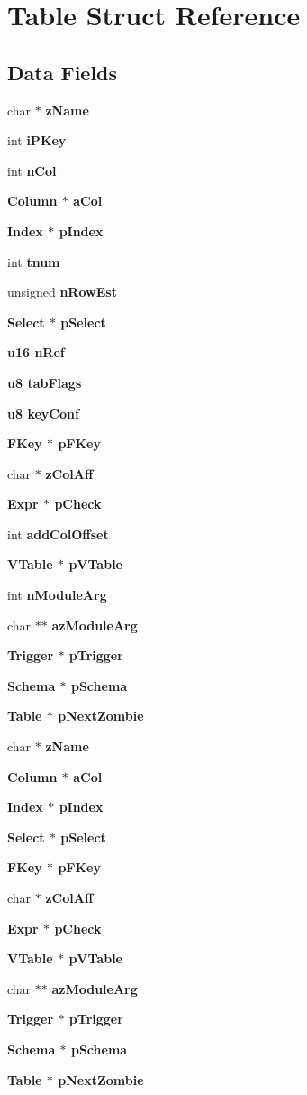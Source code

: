 \section{Table Struct Reference}
\label{structTable}
\subsection*{Data Fields}
\begin{CompactItemize}
\item 
char $\ast$ \bf{z\-Name}
\item 
int \bf{i\-PKey}
\item 
int \bf{n\-Col}
\item 
\bf{Column} $\ast$ \bf{a\-Col}
\item 
\bf{Index} $\ast$ \bf{p\-Index}
\item 
int \bf{tnum}
\item 
unsigned \bf{n\-Row\-Est}
\item 
\bf{Select} $\ast$ \bf{p\-Select}
\item 
\bf{u16} \bf{n\-Ref}
\item 
\bf{u8} \bf{tab\-Flags}
\item 
\bf{u8} \bf{key\-Conf}
\item 
\bf{FKey} $\ast$ \bf{p\-FKey}
\item 
char $\ast$ \bf{z\-Col\-Aff}
\item 
\bf{Expr} $\ast$ \bf{p\-Check}
\item 
int \bf{add\-Col\-Offset}
\item 
\bf{VTable} $\ast$ \bf{p\-VTable}
\item 
int \bf{n\-Module\-Arg}
\item 
char $\ast$$\ast$ \bf{az\-Module\-Arg}
\item 
\bf{Trigger} $\ast$ \bf{p\-Trigger}
\item 
\bf{Schema} $\ast$ \bf{p\-Schema}
\item 
\bf{Table} $\ast$ \bf{p\-Next\-Zombie}
\item 
char $\ast$ \bf{z\-Name}
\item 
\bf{Column} $\ast$ \bf{a\-Col}
\item 
\bf{Index} $\ast$ \bf{p\-Index}
\item 
\bf{Select} $\ast$ \bf{p\-Select}
\item 
\bf{FKey} $\ast$ \bf{p\-FKey}
\item 
char $\ast$ \bf{z\-Col\-Aff}
\item 
\bf{Expr} $\ast$ \bf{p\-Check}
\item 
\bf{VTable} $\ast$ \bf{p\-VTable}
\item 
char $\ast$$\ast$ \bf{az\-Module\-Arg}
\item 
\bf{Trigger} $\ast$ \bf{p\-Trigger}
\item 
\bf{Schema} $\ast$ \bf{p\-Schema}
\item 
\bf{Table} $\ast$ \bf{p\-Next\-Zombie}
\end{CompactItemize}



